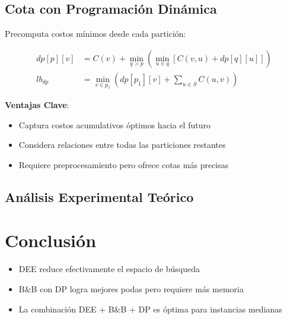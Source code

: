 \documentclass[letterpaper, 12pt]{report}
\begin{document}
\subsection{Cota con Programación Dinámica}
Precomputa costos mínimos desde cada partición:

\begin{align*}
dp[p][v] &= C(v) + \min_{q > p} \left( \min_{u \in q} [ C(v,u) + dp[q][u] ] \right) \\
lb_{dp} &= \min_{v \in p_1} \left( dp[p_1][v] + \sum_{u \in S} C(u,v) \right)
\end{align*}

\textbf{Ventajas Clave}:
\begin{itemize}
\item Captura costos acumulativos óptimos hacia el futuro
\item Considera relaciones entre todas las particiones restantes
\item Requiere preprocesamiento pero ofrece cotas más precisas
\end{itemize}

\subsection{Análisis Experimental Teórico}
\begin{table}[h]
\centering
{}
\end{table}

\section{Conclusión}
\begin{itemize}
\item DEE reduce efectivamente el espacio de búsqueda
\item B\&B con DP logra mejores podas pero requiere más memoria
\item La combinación DEE + B\&B + DP es óptima para instancias medianas
\end{itemize}
\end{document}
